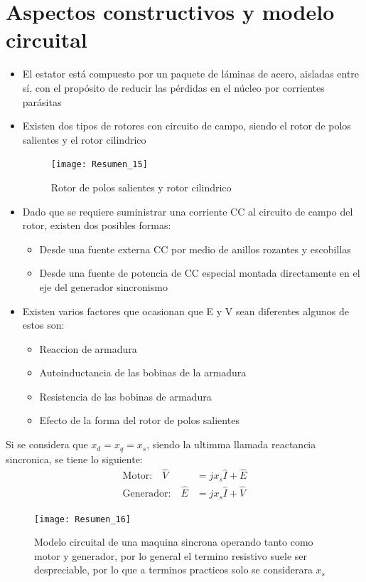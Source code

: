 \documentclass[
  11pt,
  letterpaper,
   addpoints,
   answers
  ]{exam}
\begin{document}
\section*{Aspectos constructivos y modelo circuital}
\begin{itemize}
  \item El estator está compuesto por un paquete de láminas de acero, aisladas entre sí, con
  el propósito de reducir las pérdidas en el núcleo por corrientes parásitas
  \item Existen dos tipos de rotores con circuito de campo, siendo el rotor de polos salientes y el rotor cilindrico
\begin{figure}[H]
  \centering
  \texttt{[image: Resumen\_15]}
  \caption{Rotor de polos salientes y rotor cilindrico}
\end{figure}
  \item Dado que se requiere suministrar una corriente CC al circuito de campo del rotor, existen dos posibles formas:
  \begin{itemize}
    \item Desde una fuente externa CC por medio de anillos rozantes y escobillas
    \item Desde una fuente de potencia de CC especial montada directamente en el eje del generador sincronismo
  \end{itemize} 
  \item Existen varios factores que ocasionan que E y V sean diferentes algunos de estos son:
  \begin{itemize}
    \item Reaccion de armadura
    \item Autoinductancia de las bobinas de la armadura
    \item Resistencia de las bobinas de armadura
    \item Efecto de la forma del rotor de polos salientes
  \end{itemize}
\end{itemize}
Si se considera que $x_{d} = x_{q} = x_{s}$, siendo la ultimma llamada reactancia sincronica, se tiene lo siguiente:
\begin{align}
  \text{Motor:} \quad \hat{V} &= j x_s \hat{I} + \hat{E} \\
  \text{Generador:} \quad \hat{E} &= j x_s \hat{I} + \hat{V}
\end{align}
\begin{figure}[H]
  \centering
  \texttt{[image: Resumen\_16]}
  \caption{Modelo circuital de una maquina sincrona operando tanto como motor y generador, por lo general el termino resistivo suele ser despreciable, por lo que a terminos practicos solo se considerara $x_{s}$}
\end{figure}
\end{document}
